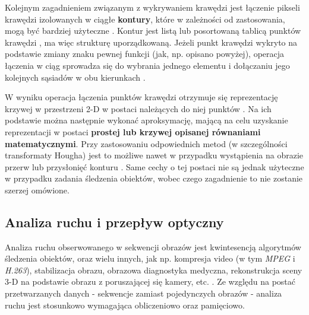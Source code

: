 Kolejnym zagadnieniem związanym z wykrywaniem krawędzi jest łączenie pikseli krawędzi izolowanych w ciągłe \textbf{kontury}, które w zależności od zastosowania, mogą być bardziej użyteczne \cite{Szeliski2011}. Kontur jest listą lub posortowaną tablicą punktów krawędzi \cite{Szeliski2011}, ma więc strukturę uporządkowaną. Jeżeli punkt krawędzi wykryto na podstawie zmiany znaku pewnej funkcji (jak, np. opisano powyżej), operacja łączenia w ciąg sprowadza się do wybrania jednego elementu i dołączaniu jego kolejnych sąsiadów w obu kierunkach \cite{Szeliski2011}.

W wyniku operacja łączenia punktów krawędzi otrzymuje się reprezentację krzywej w przestrzeni 2-D w postaci należących do niej punktów \cite{Szeliski2011}. Na ich podstawie można następnie wykonać aproksymację, mającą na celu uzyskanie reprezentacji w postaci \textbf{prostej lub krzywej opisanej równaniami matematycznymi}. Przy zastosowaniu odpowiednich metod (w szczególności transformaty Hougha) jest to możliwe nawet w przypadku wystąpienia na obrazie przerw lub przysłonięć konturu \cite{Szeliski2011}. Same cechy o tej postaci nie są jednak użyteczne w przypadku zadania śledzenia obiektów, wobec czego zagadnienie to nie zostanie szerzej omówione.

\subsection{Analiza ruchu i przepływ optyczny}
\label{subsec:Analiza_ruchu_i_przeplyw_optyczny}

Analiza ruchu obserwowanego w sekwencji obrazów jest kwintesencją algorytmów śledzenia obiektów, oraz wielu innych, jak np. kompresja video (w tym \textit{MPEG} i \textit{H.263}), stabilizacja obrazu, obrazowa diagnostyka medyczna, rekonstrukcja sceny 3-D na podstawie obrazu z poruszającej się kamery, etc. \cite{Szeliski2011}. Ze względu na postać przetwarzanych danych - sekwencje zamiast pojedynczych obrazów - analiza ruchu jest stosunkowo wymagająca obliczeniowo oraz pamięciowo. 

